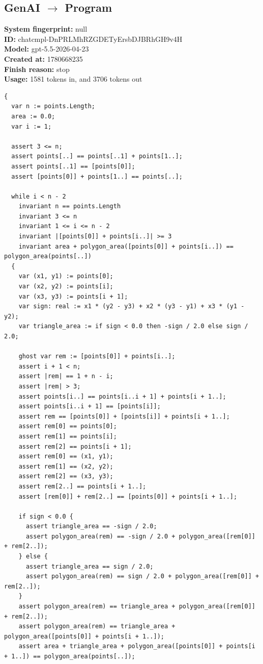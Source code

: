 \documentclass{article}
\begin{document}
\subsection*{GenAI $\rightarrow$ Program}
\textbf{System fingerprint: }null
\\\textbf{ID: }chatcmpl-DnPRLMhRZGDETyErsbDJBRhGH9v4H
\\\textbf{Model: }gpt-5.5-2026-04-23
\\\textbf{Created at: }1780668235
\\\textbf{Finish reason: }stop
\\\textbf{Usage: }1581 tokens in, and 3706 tokens out
\begin{lstlisting}
{
  var n := points.Length;
  area := 0.0;
  var i := 1;

  assert 3 <= n;
  assert points[..] == points[..1] + points[1..];
  assert points[..1] == [points[0]];
  assert [points[0]] + points[1..] == points[..];

  while i < n - 2
    invariant n == points.Length
    invariant 3 <= n
    invariant 1 <= i <= n - 2
    invariant |[points[0]] + points[i..]| >= 3
    invariant area + polygon_area([points[0]] + points[i..]) == polygon_area(points[..])
  {
    var (x1, y1) := points[0];
    var (x2, y2) := points[i];
    var (x3, y3) := points[i + 1];
    var sign: real := x1 * (y2 - y3) + x2 * (y3 - y1) + x3 * (y1 - y2);
    var triangle_area := if sign < 0.0 then -sign / 2.0 else sign / 2.0;

    ghost var rem := [points[0]] + points[i..];
    assert i + 1 < n;
    assert |rem| == 1 + n - i;
    assert |rem| > 3;
    assert points[i..] == points[i..i + 1] + points[i + 1..];
    assert points[i..i + 1] == [points[i]];
    assert rem == [points[0]] + [points[i]] + points[i + 1..];
    assert rem[0] == points[0];
    assert rem[1] == points[i];
    assert rem[2] == points[i + 1];
    assert rem[0] == (x1, y1);
    assert rem[1] == (x2, y2);
    assert rem[2] == (x3, y3);
    assert rem[2..] == points[i + 1..];
    assert [rem[0]] + rem[2..] == [points[0]] + points[i + 1..];

    if sign < 0.0 {
      assert triangle_area == -sign / 2.0;
      assert polygon_area(rem) == -sign / 2.0 + polygon_area([rem[0]] + rem[2..]);
    } else {
      assert triangle_area == sign / 2.0;
      assert polygon_area(rem) == sign / 2.0 + polygon_area([rem[0]] + rem[2..]);
    }
    assert polygon_area(rem) == triangle_area + polygon_area([rem[0]] + rem[2..]);
    assert polygon_area(rem) == triangle_area + polygon_area([points[0]] + points[i + 1..]);
    assert area + triangle_area + polygon_area([points[0]] + points[i + 1..]) == polygon_area(points[..]);


\end{lstlisting}
\end{document}
